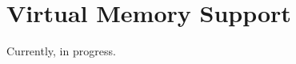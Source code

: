 \documentclass{book}
\newcommand{\clearandresetpage}{%
  \clearpage
  \setcounter{page}{1}%
}
\begin{document}
\section{Virtual Memory Support}
Currently, in progress.


\clearandresetpage %
\end{document}
